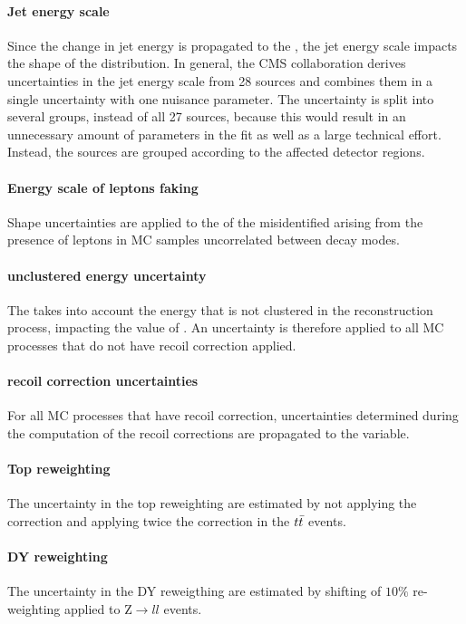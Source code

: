 \paragraph{Jet energy scale} Since the change in jet energy is propagated to the \MET, the jet energy scale impacts the shape of the \mttot distribution. In general, the CMS collaboration derives uncertainties in the jet energy scale from 28 sources and combines them in a single uncertainty with one nuisance parameter. The uncertainty is split into several groups, instead of all 27 sources, because this would result in an unnecessary amount of parameters in the fit as well as a large technical effort. Instead, the sources are grouped according to the affected detector regions.

\paragraph{Energy scale of leptons faking \tauh} Shape uncertainties are applied to the \pt of the misidentified \tauh arising from the presence of leptons in MC samples uncorrelated between decay modes.

\paragraph{\MET unclustered energy uncertainty} The \MET takes into account the energy that is not clustered in the reconstruction process, impacting the value of \mttot. An uncertainty is therefore applied to all MC processes that do not have recoil correction applied.

\paragraph{\MET recoil correction uncertainties} For all MC processes that have recoil correction, uncertainties determined during the computation of the recoil corrections are propagated to the \mtot variable.

\paragraph{Top \pt reweighting} The uncertainty in the top \pt reweighting are estimated by not applying the correction and applying twice the correction in the $t\Bar{t}$ events.

\paragraph{DY \pt reweighting} The uncertainty in the DY \pt reweigthing are estimated by shifting of $10\%$ re-weighting applied to $\mathrm{Z}\rightarrow ll$ events.

